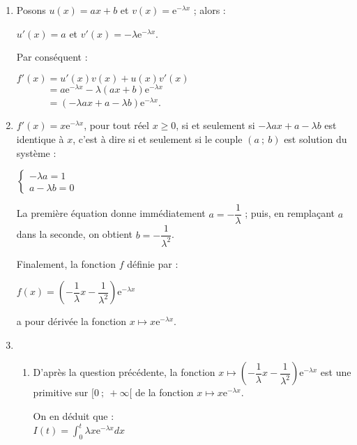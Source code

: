 \begin{corrige}
     \begin{enumerate}
          \item %
          Posons $u(x)=ax+b$ et $v(x)=\text{e}^{-\lambda x}$ ; alors :
          \par
          $u'(x)=a$ et $v'(x)=-\lambda \text{e}^{-\lambda x}$.
          \par
          Par conséquent :
          \par
          $f'(x)= u'(x)v(x)+u(x)v'(x)$\\
          $\phantom{f'(x)}=a\text{e}^{-\lambda x}-\lambda (ax+b)\text{e}^{-\lambda x}$\\
          $\phantom{f'(x)}=(-\lambda ax+a-\lambda b)\text{e}^{-\lambda x}$.
          \item %
          $f'(x)=x\text{e}^{-\lambda x}$, pour tout réel $x \geqslant 0$, si et seulement si $-\lambda ax+a-\lambda b$ est identique à $x$, c'est à dire si et seulement si le couple $(a~;~b)$ est solution du système :
          \par
          $\begin{cases}
               -\lambda a = 1\\
               a-\lambda b = 0
          \end{cases}$
          \par
          La première équation donne immédiatement $a=-\dfrac{1}{\lambda }$ ; puis, en remplaçant $a$ dans la seconde, on obtient $b=-\dfrac{1}{\lambda^2 }$.
          \par
          Finalement, la fonction $f$ définie par :
          \begin{center}
               $f(x)=\left(-\dfrac{1}{\lambda }x-\dfrac{1}{\lambda ^2}\right)\text{e}^{-\lambda x}$
          \end{center}
          a pour dérivée la fonction $x \longmapsto x\text{e}^{-\lambda x}$.
          \item %
          \begin{enumerate}[label=\alph*.]
               \item %
               D'après la question précédente, la fonction $x \longmapsto \left(-\dfrac{1}{\lambda }x-\dfrac{1}{\lambda ^2}\right)\text{e}^{-\lambda x}$ est une primitive sur $[0~;~+\infty[$ de la fonction $x \longmapsto x\text{e}^{-\lambda x}$.
               \par
               On en déduit que :\\
               $I(t)=\displaystyle\int_{0}^{t}\lambda x \text{e}^{-\lambda x}dx$\\

\end{enumerate}
\end{enumerate}
\end{corrige}
